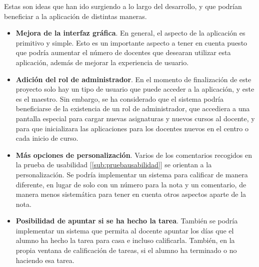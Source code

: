 Estas son ideas que han ido surgiendo a lo largo del desarrollo, y que podrían beneficiar a la aplicación de distintas maneras.

\begin{itemize}
	\item \textbf{Mejora de la interfaz gráfica}. En general, el aspecto de la aplicación es primitivo y simple. Esto es un importante aspecto a tener en cuenta puesto que podría aumentar el número de docentes que desearan utilizar esta aplicación, además de mejorar la experiencia de usuario.
	\item \textbf{Adición del rol de administrador}. En el momento de finalización de este proyecto solo hay un tipo de usuario que puede acceder a la aplicación, y este es el maestro. Sin embargo, se ha considerado que el sistema podría beneficiarse de la existencia de un rol de administrador, que accediera a una pantalla especial para cargar nuevas asignaturas y nuevos cursos al docente, y para que inicializara las aplicaciones para los docentes nuevos en el centro o cada inicio de curso.
	\item \textbf{Más opciones de personalización}. Varios de los comentarios recogidos en la prueba de usabilidad [\ref{sub:pruebausabilidad}] se orientan a la personalización. Se podría implementar un sistema para calificar de manera diferente, en lugar de solo con un número para la nota y un comentario, de manera menos sistemática para tener en cuenta otros aspectos aparte de la nota.
	\item \textbf{Posibilidad de apuntar si se ha hecho la tarea}. También se podría implementar un sistema que permita al docente apuntar los días que el alumno ha hecho la tarea para casa e incluso calificarla. También, en la propia ventana de calificación de tareas, si el alumno ha terminado o no haciendo esa tarea.
\end{itemize}
